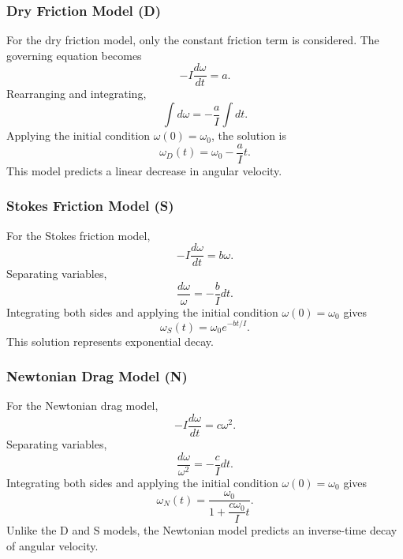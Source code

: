 \documentclass[11pt,letterpaper]{article}
\begin{document}
\subsubsection{Dry Friction Model (D)}
For the dry friction model, only the constant friction term is considered. The governing equation becomes
\begin{equation}
-I\frac{d\omega}{dt}=a.
\end{equation}
Rearranging and integrating,
\begin{equation}
\int d\omega=-\frac{a}{I}\int dt.
\end{equation}
Applying the initial condition $\omega(0)=\omega_0$, the solution is
\begin{equation}
\boxed{
\omega_D(t)=\omega_0-\frac{a}{I}t}.
\end{equation}
This model predicts a linear decrease in angular velocity.
\subsubsection{Stokes Friction Model (S)}
For the Stokes friction model,
\begin{equation}
-I\frac{d\omega}{dt}=b\omega.
\end{equation}
Separating variables,
\begin{equation}
\frac{d\omega}{\omega}=-\frac{b}{I}dt.
\end{equation}
Integrating both sides and applying the initial condition $\omega(0)=\omega_0$ gives
\begin{equation}
\boxed{
\omega_S(t)=\omega_0e^{-bt/I}
}.
\end{equation}
This solution represents exponential decay.
\subsubsection{Newtonian Drag Model (N)}
For the Newtonian drag model,
\begin{equation}
-I\frac{d\omega}{dt}=c\omega^2.
\end{equation}
Separating variables,
\begin{equation}
\frac{d\omega}{\omega^2}=-\frac{c}{I}dt.
\end{equation}
Integrating both sides and applying the initial condition $\omega(0)=\omega_0$ gives
\begin{equation}
\boxed{
\omega_N(t)=\frac{\omega_0}{1+\dfrac{c\omega_0}{I}t}
}.
\end{equation}  
Unlike the D and S models, the Newtonian model predicts an inverse-time decay of angular velocity.
\end{document}
